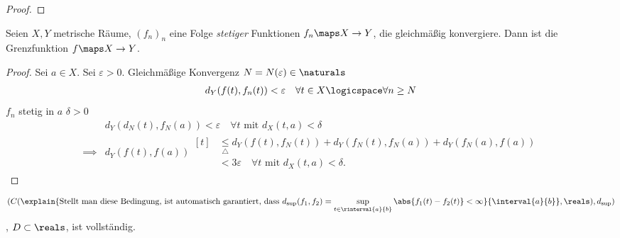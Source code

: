 \begin{lemma}
\begin{eigenschaftenenumerate}
\begin{proof}
            
        \end{proof}
        \item \label{gleichmaessige_konvergenz_stetigkeit}Seien \( X,Y\) metrische Räume, \( (f_n)_n\) eine Folge \emph{stetiger} Funktionen \( f_n\maps X\to Y\), die gleichmäßig konvergiere. Dann ist die Grenzfunktion \( f\maps X\to Y\).
        \begin{proof}
            Sei \( a\in X\). Sei \( \varepsilon>0 \). Gleichmäßige Konvergenz \timplies \texists \( N=N(\varepsilon)\in \naturals \) \sd 
            \begin{align*}
                d_Y(f(t),f_n(t))<\varepsilon\quad \forall t\in X\logicspace \forall n\geq N
            \end{align*} 
            \( f_n\) stetig in \( a\) \timplies \texists \( \delta > 0 \) \sd
            \begin{align*}
                &d_Y(d_N(t),f_N(a))<\varepsilon\quad \forall t\text{ mit } d_X(t,a)<\delta\\
                \implies &d_Y(f(t),f(a))\begin{aligned}[t]
                    &\underset{\triangle}{\leq}d_Y(f(t),f_N(t))+d_Y(f_N(t),f_N(a))+d_Y(f_N(a),f(a))\\
                    &<3\varepsilon\quad \forall t\text{ mit }d_X(t,a)<\delta.
                \end{aligned}
            \end{align*}
            
        \end{proof}
         
    \end{eigenschaftenenumerate}
        
\end{lemma}
\begin{folgerung*}
    \begin{align*}
        (C(\explain{\text{Stellt man diese Bedingung, ist automatisch garantiert, dass \( d_{\sup}(f_1,f_2)=\sup_{t\in \rinterval{a}{b}}\abs{f_1(t)-f_2(t)}<\infty \)}}{\interval{a}{b}},\reals),d_{\sup})
    \end{align*}, \( D\subset \reals \), ist vollständig.  
\end{folgerung*}
